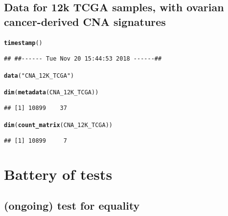 \documentclass{article}\usepackage[]{graphicx}\usepackage[]{color}
\makeatletter
\newcommand{\hlstr}[1]{\textcolor[rgb]{0.192,0.494,0.8}{#1}}%
\newcommand{\hlstd}[1]{\textcolor[rgb]{0.345,0.345,0.345}{#1}}%
\newcommand{\hlkwd}[1]{\textcolor[rgb]{0.737,0.353,0.396}{\textbf{#1}}}%
\newenvironment{kframe}{%
 \def\at@end@of@kframe{}%
 \ifinner\ifhmode%
  \def\at@end@of@kframe{\end{minipage}}%
  \begin{minipage}{\columnwidth}%
 \fi\fi%
 \def\FrameCommand##1{\hskip\@totalleftmargin \hskip-\fboxsep
 \colorbox{shadecolor}{##1}\hskip-\fboxsep
     \hskip-\linewidth \hskip-\@totalleftmargin \hskip\columnwidth}%
 \MakeFramed {\advance\hsize-\width
   \@totalleftmargin\z@ \linewidth\hsize
   \@setminipage}}%
 {\par\unskip\endMakeFramed%
 \at@end@of@kframe}
\newenvironment{knitrout}{}{} %
\makeatother
\begin{document}
\subsection{Data for 12k TCGA samples, with ovarian cancer-derived CNA signatures}

\begin{knitrout}
\color{fgcolor}\begin{kframe}
\begin{alltt}
\hlkwd{timestamp}\hlstd{()}
\end{alltt}
\begin{verbatim}
## ##------ Tue Nov 20 15:44:53 2018 ------##
\end{verbatim}
\begin{alltt}
\hlkwd{data}\hlstd{(}\hlstr{"CNA_12K_TCGA"}\hlstd{)}

\hlkwd{dim}\hlstd{(}\hlkwd{metadata}\hlstd{(CNA_12K_TCGA))}
\end{alltt}
\begin{verbatim}
## [1] 10899    37
\end{verbatim}
\begin{alltt}
\hlkwd{dim}\hlstd{(}\hlkwd{count_matrix}\hlstd{(CNA_12K_TCGA))}
\end{alltt}
\begin{verbatim}
## [1] 10899     7
\end{verbatim}
\end{kframe}
\end{knitrout}

\section{Battery of tests}
\subsection{(ongoing) test for equality}
\end{document}
